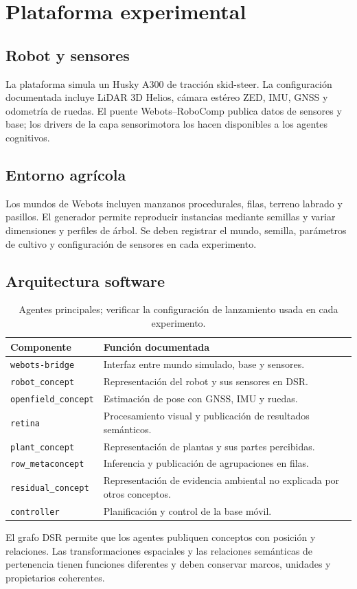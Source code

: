 \documentclass[12pt,a4paper]{article}
\begin{document}
\section{Plataforma experimental}
\subsection{Robot y sensores}
La plataforma simula un Husky A300 de tracción skid-steer. La configuración documentada incluye LiDAR 3D Helios, cámara estéreo ZED, IMU, GNSS y odometría de ruedas. El puente Webots--RoboComp publica datos de sensores y base; los drivers de la capa sensorimotora los hacen disponibles a los agentes cognitivos.
\subsection{Entorno agrícola}
Los mundos de Webots incluyen manzanos procedurales, filas, terreno labrado y pasillos. El generador permite reproducir instancias mediante semillas y variar dimensiones y perfiles de árbol. Se deben registrar el mundo, semilla, parámetros de cultivo y configuración de sensores en cada experimento.
\subsection{Arquitectura software}
\begin{table}[h]
\centering\begin{tabularx}{\textwidth}{lX}\toprule
Componente & Función documentada \\\midrule
\texttt{webots-bridge} & Interfaz entre mundo simulado, base y sensores. \\
\texttt{robot\_concept} & Representación del robot y sus sensores en DSR. \\
\texttt{openfield\_concept} & Estimación de pose con GNSS, IMU y ruedas. \\
\texttt{retina} & Procesamiento visual y publicación de resultados semánticos. \\
\texttt{plant\_concept} & Representación de plantas y sus partes percibidas. \\
\texttt{row\_metaconcept} & Inferencia y publicación de agrupaciones en filas. \\
\texttt{residual\_concept} & Representación de evidencia ambiental no explicada por otros conceptos. \\
\texttt{controller} & Planificación y control de la base móvil. \\
\bottomrule\end{tabularx}\caption{Agentes principales; verificar la configuración de lanzamiento usada en cada experimento.}\end{table}
El grafo DSR permite que los agentes publiquen conceptos con posición y relaciones. Las transformaciones espaciales y las relaciones semánticas de pertenencia tienen funciones diferentes y deben conservar marcos, unidades y propietarios coherentes.
\end{document}
